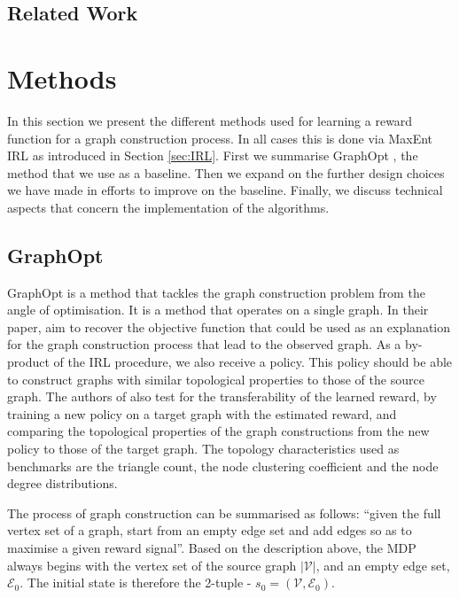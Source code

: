 \documentclass{report}
\numberwithin{equation}{section}
\numberwithin{figure}{section}
\numberwithin{table}{section}
\numberwithin{algorithm}{section}
\begin{document}
\section{Related Work}\label{sec:RelatedWork}


\chapter{Methods}\label{chap:methods}
In this section we present the different methods used 
for learning a reward function for a graph construction process. 
In all cases this is done via MaxEnt IRL as introduced in 
Section \ref{sec:IRL}.
First we summarise GraphOpt \citep{GraphOpt}, 
the method that we use as a baseline. Then we expand on the 
further design choices we have made in efforts to improve 
on the baseline. Finally, we discuss technical aspects that 
concern the implementation of the algorithms.

\section{GraphOpt}\label{sec:GraphOpt}
GraphOpt is a method that tackles the graph construction 
problem from the angle of optimisation. It is a method that 
operates on a single graph. In their paper, 
\cite{GraphOpt} aim to recover the objective function 
that could be used as an explanation for the graph construction 
process that lead to the observed graph. As a by-product 
of the IRL procedure, we also receive a policy. This policy 
should be able to construct graphs with similar topological 
properties to those of the source graph. The authors of \cite{GraphOpt} 
also test for the transferability of the learned reward, by 
training a new policy on a target graph with the estimated 
reward, and comparing the 
topological properties of the graph constructions from the 
new policy to those of the target graph. The 
topology characteristics used as 
benchmarks are the triangle count, the node clustering coefficient 
and the node degree distributions.

The process of graph construction can be summarised as follows: 
``given the full vertex set of a graph, start from 
an empty edge set and add edges so as to maximise 
a given reward signal''.
Based on the description above, the MDP always begins 
with the vertex set of the source graph $|\mathcal{V}|$, 
and an empty edge set, $\mathcal{E}_0$. The initial state is 
therefore the 2-tuple - $s_0=(\mathcal{V}, \mathcal{E}_0)$.
\end{document}
